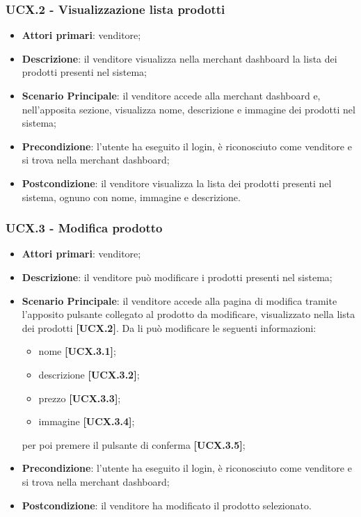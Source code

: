 \subsubsection{UCX.2 - Visualizzazione lista prodotti}
\begin{itemize}
\item \textbf{Attori primari}: venditore;
\item \textbf{Descrizione}: il venditore visualizza nella merchant dashboard la lista dei prodotti presenti nel sistema;
\item \textbf{Scenario Principale}: il venditore accede alla merchant dashboard e, nell'apposita sezione, visualizza nome, descrizione e immagine dei prodotti nel sistema;
\item \textbf{Precondizione}: l'utente ha eseguito il login, è riconosciuto come venditore e si trova nella merchant dashboard;
\item \textbf{Postcondizione}: il venditore visualizza la lista dei prodotti presenti nel sistema, ognuno con nome, immagine e descrizione.
\end{itemize}

\subsubsection{UCX.3 - Modifica prodotto}
\begin{itemize}
\item \textbf{Attori primari}: venditore;
\item \textbf{Descrizione}: il venditore può modificare i prodotti presenti nel sistema;
\item \textbf{Scenario Principale}: il venditore accede alla pagina di modifica tramite l'apposito pulsante collegato al prodotto da modificare, visualizzato nella lista dei prodotti \textbf{[UCX.2]}. Da li può modificare le seguenti informazioni:
\begin{itemize}
	\item nome \textbf{[UCX.3.1]};
	\item descrizione \textbf{[UCX.3.2]};
	\item prezzo \textbf{[UCX.3.3]};
	\item immagine \textbf{[UCX.3.4]};
\end{itemize}
per poi premere il pulsante di conferma \textbf{[UCX.3.5]};
\item \textbf{Precondizione}: l'utente ha eseguito il login, è riconosciuto come venditore e si trova nella merchant dashboard;
\item \textbf{Postcondizione}: il venditore ha modificato il prodotto selezionato.
\end{itemize}

